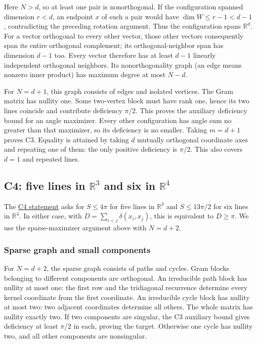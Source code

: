 \documentclass[11pt,a4paper]{article}
\begin{document}
Here \(N>d\), so at least one pair is nonorthogonal. If the configuration spanned dimension \(r<d\), an endpoint \(x\) of such a pair would have \(\dim W\le r-1<d-1\), contradicting the preceding rotation argument. Thus the configuration spans \(\mathbb R^d\). For a vector orthogonal to every other vector, those other vectors consequently span its entire orthogonal complement; its orthogonal-neighbor span has dimension \(d-1\) too. Every vector therefore has at least \(d-1\) linearly independent orthogonal neighbors. Its nonorthogonality graph (an edge means nonzero inner product) has maximum degree at most \(N-d\).

For \(N=d+1\), this graph consists of edges and isolated vertices. The Gram matrix has nullity one. Some two-vertex block must have rank one, hence its two lines coincide and contribute deficiency \(\pi/2\). This proves the auxiliary deficiency bound for an angle maximizer. Every other configuration has angle sum no greater than that maximizer, so its deficiency is no smaller. Taking \(m=d+1\) proves C3. Equality is attained by taking \(d\) mutually orthogonal coordinate axes and repeating one of them: the only positive deficiency is \(\pi/2\). This also covers \(d=1\) and repeated lines.

\subsection{\texorpdfstring{C4: five lines in \(\mathbb R^3\) and six in \(\mathbb R^4\)}{C4: five lines in \textbackslash mathbb R\^{}3 and six in \textbackslash mathbb R\^{}4}}\label{c4-five-lines-in-mathbb-r3-and-six-in-mathbb-r4}

The \href{https://hackathon.bainsa.ai/p/p1/c4}{C4 statement} asks for \(S\le4\pi\) for five lines in \(\mathbb R^3\) and \(S\le13\pi/2\) for six lines in \(\mathbb R^4\). In either case, with \(D=\sum_{i<j}\delta(x_i,x_j)\), this is equivalent to \(D\ge\pi\). We use the sparse-maximizer argument above with \(N=d+2\).

\subsubsection{Sparse graph and small components}\label{sparse-graph-and-small-components}

For \(N=d+2\), the sparse graph consists of paths and cycles. Gram blocks belonging to different components are orthogonal. An irreducible path block has nullity at most one: the first row and the tridiagonal recurrence determine every kernel coordinate from the first coordinate. An irreducible cycle block has nullity at most two: two adjacent coordinates determine all others. The whole matrix has nullity exactly two. If two components are singular, the C3 auxiliary bound gives deficiency at least \(\pi/2\) in each, proving the target. Otherwise one cycle has nullity two, and all other components are nonsingular.
\end{document}
